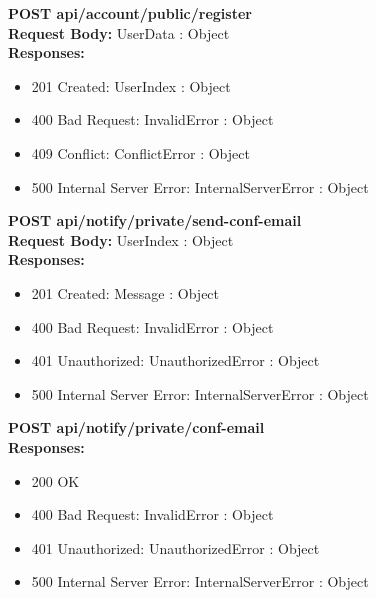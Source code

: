 \noindent\textbf{\color{titleColor}POST api/account/public/register}
\vspace{2pt}
\\\textbf{\color{titleColor}Request Body:} UserData : Object 
\vspace{4pt}
\\\textbf{\color{titleColor}Responses:} 
\begin{itemize}
    \item {\color{titleColor}201 Created:} UserIndex : Object
    \item {\color{titleColor}400 Bad Request:} InvalidError : Object
    \item {\color{titleColor}409 Conflict:} ConflictError : Object
    \item {\color{titleColor}500 Internal Server Error:} InternalServerError : Object
\end{itemize}
\vspace{10pt}
\noindent{\color{titleColor}\rule{0.8\linewidth}{0.2mm}}
\vspace{10pt}

\noindent\textbf{\color{titleColor}POST api/notify/private/send-conf-email}
\vspace{2pt}
\\\textbf{\color{titleColor}Request Body:} UserIndex : Object 
\vspace{4pt}
\\\textbf{\color{titleColor}Responses:} 
\begin{itemize}
    \item {\color{titleColor}201 Created:} Message : Object
    \item {\color{titleColor}400 Bad Request:} InvalidError : Object
    \item {\color{titleColor}401 Unauthorized:} UnauthorizedError : Object
    \item {\color{titleColor}500 Internal Server Error:} InternalServerError : Object
\end{itemize}
\vspace{10pt}
\noindent{\color{titleColor}\rule{0.8\linewidth}{0.2mm}}
\vspace{10pt}

\noindent\textbf{\color{titleColor}POST api/notify/private/conf-email}
\vspace{2pt}
\\\textbf{\color{titleColor}Responses:} 
\begin{itemize}
    \item {\color{titleColor}200 OK}
    \item {\color{titleColor}400 Bad Request:} InvalidError : Object
    \item {\color{titleColor}401 Unauthorized:} UnauthorizedError : Object
    \item {\color{titleColor}500 Internal Server Error:} InternalServerError : Object
\end{itemize}
\vspace{10pt}
\noindent{\color{titleColor}\rule{0.8\linewidth}{0.2mm}}
\vspace{10pt}

